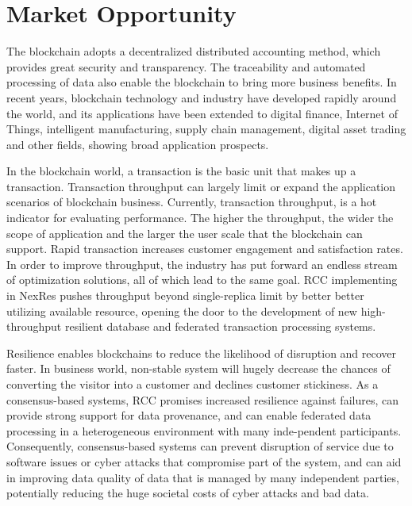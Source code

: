 \section{Market Opportunity}
The blockchain adopts a decentralized distributed accounting method, which provides great security and transparency. The traceability and automated processing of data also enable the blockchain to bring more business benefits. In recent years, blockchain technology and industry have developed rapidly around the world, and its applications have been extended to digital finance, Internet of Things, intelligent manufacturing, supply chain management, digital asset trading and other fields, showing broad application prospects. 

In the blockchain world, a transaction is the basic unit that makes up a transaction. Transaction throughput can largely limit or expand the application scenarios of blockchain business. Currently, transaction throughput, is a hot indicator for evaluating performance. The higher the throughput, the wider the scope of application and the larger the user scale that the blockchain can support. Rapid transaction increases customer engagement and satisfaction rates. In order to improve throughput, the industry has put forward an endless stream of optimization solutions, all of which lead to the same goal. RCC implementing in NexRes pushes throughput beyond single-replica limit by better better utilizing available resource, opening the door to the development of new high-throughput resilient database and federated transaction processing systems.

Resilience enables blockchains to reduce the likelihood of disruption and recover faster. In business world, non-stable system will hugely decrease the chances of converting the  visitor into a customer and declines customer stickiness. As a consensus-based systems, RCC promises increased resilience against failures, can provide strong support for data provenance, and can enable federated data processing in a heterogeneous environment with many inde-pendent participants. Consequently, consensus-based systems can prevent disruption of service due to software issues or cyber attacks that compromise part of the system, and can aid in improving data quality of data that is managed by many independent parties, potentially reducing the huge societal costs of cyber attacks and bad data.
